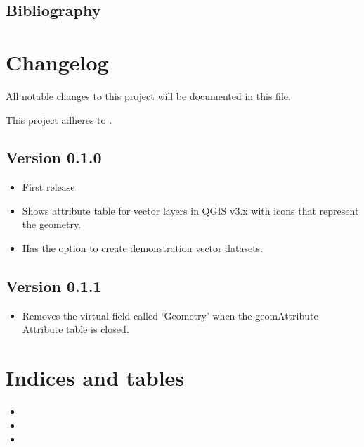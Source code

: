 \documentclass[letterpaper,10pt,english]{sphinxmanual}
\begin{document}
\section{Bibliography}
\label{\detokenize{concept:bibliography}}



\chapter{Changelog}
\label{\detokenize{changelog:changelog}}\label{\detokenize{changelog::doc}}
All notable changes to this project will be documented in this file.

This project adheres to .


\section{Version 0.1.0}
\label{\detokenize{changelog:version-0-1-0}}\begin{itemize}
\item {} 
First release

\item {} 
Shows attribute table for vector layers in QGIS v3.x with icons that represent the geometry.

\item {} 
Has the option to create demonstration vector datasets.

\end{itemize}


\section{Version 0.1.1}
\label{\detokenize{changelog:version-0-1-1}}\begin{itemize}
\item {} 
Removes the virtual field called ‘Geometry’ when the geomAttribute Attribute table is closed.

\end{itemize}


\chapter{Indices and tables}
\label{\detokenize{index:indices-and-tables}}\begin{itemize}
\item {} 

\item {} 

\item {} 

\end{itemize}
\end{document}
